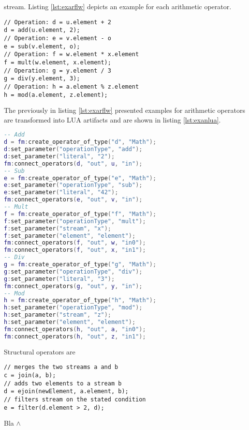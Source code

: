 stream. Listing \ref{lst:exarflw} depicts an example for each arithmetic 
operator.
\begin{lstlisting}[language=Flow, caption={\emph{Examples of Arithmetic Operators in Flow}},label={lst:exarflw}]
// Operation: d = u.element + 2
d = add(u.element, 2);
// Operation: e = v.element - o
e = sub(v.element, o);
// Operation: f = w.element * x.element
f = mult(w.element, x.element);
// Operation: g = y.element / 3
g = div(y.element, 3);
// Operation: h = a.element % z.element
h = mod(a.element, z.element); 
\end{lstlisting}
The previously in listing \ref{lst:exarflw} presented examples for 
arithmetic operators are transformed into LUA artifacts and are shown in listing
\ref{lst:exanlua}.
\begin{lstlisting}[language=LUA, caption={\emph{Examples of Arithmetic Operators in LUA}},label={lst:exanlua}]
-- Add
d = fm:create_operator_of_type("d", "Math");
d:set_parameter("operationType", "add");
d:set_parameter("literal", "2");
fm:connect_operators(d, "out", u, "in");
-- Sub
e = fm:create_operator_of_type("e", "Math");
e:set_parameter("operationType", "sub");
e:set_parameter("literal", "42");
fm:connect_operators(e, "out", v, "in");
-- Mult
f = fm:create_operator_of_type("f", "Math");
f:set_parameter("operationType", "mult");
f:set_parameter("stream", "x");
f:set_parameter("element", "element");
fm:connect_operators(f, "out", w, "in0");
fm:connect_operators(f, "out", x, "in1");
-- Div
g = fm:create_operator_of_type("g", "Math");
g:set_parameter("operationType", "div");
g:set_parameter("literal", "3");
fm:connect_operators(g, "out", y, "in");
-- Mod
h = fm:create_operator_of_type("h", "Math");
h:set_parameter("operationType", "mod");
h:set_parameter("stream", "z");
h:set_parameter("element", "element");
fm:connect_operators(h, "out", a, "in0");
fm:connect_operators(h, "out", z, "in1");
\end{lstlisting}
Structural operators are
\begin{lstlisting}[language=Flow, caption={\emph{Examples of Structural Operators}},label={lst:exsysflw}]
// merges the two streams a and b
c = join(a, b);
// adds two elements to a stream b
d = ejoin(newElement, a.element, b);	
// filters stream on the stated condition
e = filter(d.element > 2, d);
\end{lstlisting}
Bla $\wedge$
